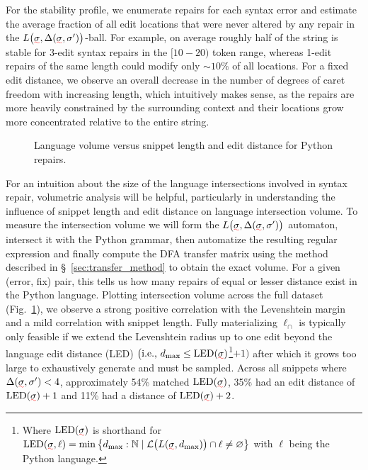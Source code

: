 \documentclass[sigplan,acmsmall,nonacm,screen]{acmart}\settopmatter{printfolios=false,printccs=false,printacmref=false}
\begin{document}
For the stability profile, we enumerate repairs for each syntax error and estimate the average fraction of all edit locations that were never altered by any repair in the $L\big(\err\sigma, \Delta(\err\sigma, \sigma')\big)$-ball. For example, on average roughly half of the string is stable for 3-edit syntax repairs in the $[10-20)$ token range, whereas 1-edit repairs of the same length could modify only $\sim 10\%$ of all locations. For a fixed edit distance, we observe an overall decrease in the number of degrees of caret freedom with increasing length, which intuitively makes sense, as the repairs are more heavily constrained by the surrounding context and their locations grow more concentrated relative to the entire string.

\begin{figure}
\vspace{-0.4cm}
\resizebox{.45\textwidth}{!}{}
\vspace{-0.8cm}
\caption{Language volume versus snippet length and edit distance for Python repairs.}
\label{fig:volumetric_plot}
\vspace{-0.2cm}
\end{figure}

For an intuition about the size of the language intersections involved in syntax repair, volumetric analysis will be helpful, particularly in understanding the influence of snippet length and edit distance on language intersection volume. To measure the intersection volume we will form the $L\big(\err\sigma, \Delta(\err{\sigma}, \sigma')\big)$ automaton, intersect it with the Python grammar, then automatize the resulting regular expression and finally compute the DFA transfer matrix using the method described in \S~\ref{sec:transfer_method} to obtain the exact volume. For a given (error, fix) pair, this tells us how many repairs of equal or lesser distance exist in the Python language. Plotting intersection volume across the full dataset (Fig.~\ref{fig:volumetric_plot}), we observe a strong positive correlation with the Levenshtein margin and a mild correlation with snippet length. Fully materializing $\ell_\cap$ is typically only feasible if we extend the Levenshtein radius up to one edit beyond the language edit distance (LED) $\big(\text{i.e., } d_{\max} \leq \text{LED}(\err\sigma)$\footnote{Where $\text{LED}(\err\sigma)$ is shorthand for $\text{LED}(\err\sigma, \ell) = \min \big\{d_{\max}: \mathbb{N}\mid \mathcal{L}\big(L(\err\sigma, d_{\max})\big) \cap \ell \neq \varnothing\big\}$ with $\ell$ being the Python language.}$+ 1\big)$ after which it grows too large to exhaustively generate and must be sampled. Across all snippets where $\Delta(\err{\sigma}, \sigma') < 4$, approximately 54\% matched $\text{LED}(\err\sigma)$, 35\% had an edit distance of $\text{LED}(\err\sigma) + 1$ and 11\% had a distance of $\text{LED}(\err\sigma) + 2$.
\end{document}
